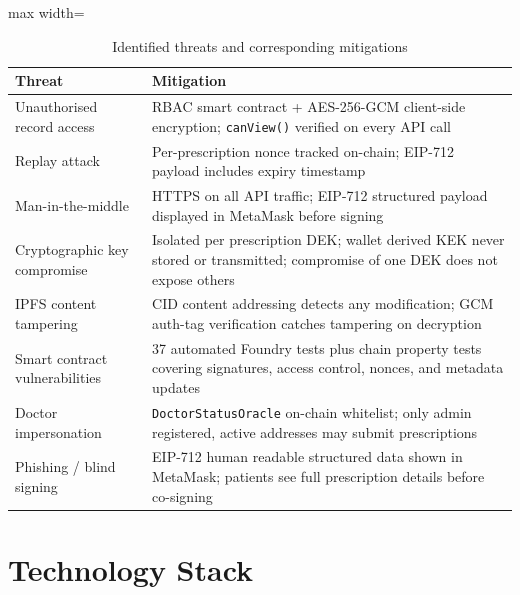 \documentclass[12pt,a4wide]{report}
\begin{document}
\begin{table}[H]
\centering
\caption{Identified threats and corresponding mitigations}
\label{tab:threats}
\begin{adjustbox}{max width=\textwidth}
\begin{tabular}{@{}p{4.5cm}p{8.5cm}@{}}
\toprule
\textbf{Threat} & \textbf{Mitigation} \\
\midrule
Unauthorised record access   & RBAC smart contract + AES-256-GCM client-side encryption; \texttt{canView()} verified on every API call \\[4pt]
Replay attack                & Per-prescription nonce tracked on-chain; EIP-712 payload includes expiry timestamp \\[4pt]
Man-in-the-middle            & HTTPS on all API traffic; EIP-712 structured payload displayed in MetaMask before signing \\[4pt]
Cryptographic key compromise & Isolated per prescription DEK; wallet derived KEK never stored or transmitted; compromise of one DEK does not expose others \\[4pt]
IPFS content tampering       & CID content addressing detects any modification; GCM auth-tag verification catches tampering on decryption \\[4pt]
Smart contract vulnerabilities & 37 automated Foundry tests plus chain property tests covering signatures, access control, nonces, and metadata updates \\[4pt]
Doctor impersonation         & \texttt{DoctorStatusOracle} on-chain whitelist; only admin registered, active addresses may submit prescriptions \\[4pt]
Phishing / blind signing     & EIP-712 human readable structured data shown in MetaMask; patients see full prescription details before co-signing \\
\bottomrule
\end{tabular}
\end{adjustbox}
\end{table}

\section{Technology Stack}
\end{document}

